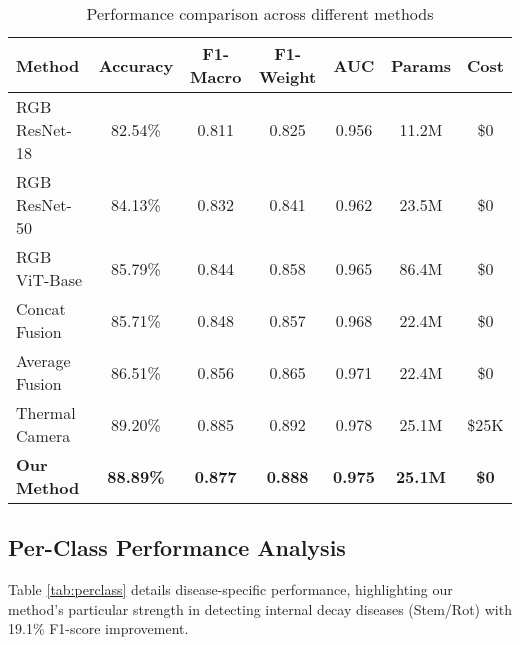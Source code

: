 \documentclass[conference]{IEEEtran}
\begin{document}
\begin{table}[htbp]
    \caption{Performance comparison across different methods}
    \label{tab:performance}
    \centering
    \footnotesize
    \setlength{\tabcolsep}{3pt}
    \begin{tabular}{|l|c|c|c|c|c|c|}
        \hline
        \textbf{Method} & \textbf{Accuracy} & \textbf{F1-Macro} & \textbf{F1-Weight} & \textbf{AUC} & \textbf{Params} & \textbf{Cost} \\
        \hline
        RGB ResNet-18 & 82.54\% & 0.811 & 0.825 & 0.956 & 11.2M & \$0 \\
        RGB ResNet-50 & 84.13\% & 0.832 & 0.841 & 0.962 & 23.5M & \$0 \\
        RGB ViT-Base & 85.79\% & 0.844 & 0.858 & 0.965 & 86.4M & \$0 \\
        Concat Fusion & 85.71\% & 0.848 & 0.857 & 0.968 & 22.4M & \$0 \\
        Average Fusion & 86.51\% & 0.856 & 0.865 & 0.971 & 22.4M & \$0 \\
        Thermal Camera & 89.20\% & 0.885 & 0.892 & 0.978 & 25.1M & \$25K \\
        \rowcolor{green!20}
        \textbf{Our Method} & \textbf{88.89\%} & \textbf{0.877} & \textbf{0.888} & \textbf{0.975} & \textbf{25.1M} & \textbf{\$0} \\
        \hline
    \end{tabular}
\end{table}

\subsection{Per-Class Performance Analysis}

Table \ref{tab:perclass} details disease-specific performance, highlighting our method's particular strength in detecting internal decay diseases (Stem/Rot) with 19.1\% F1-score improvement.
\end{document}
